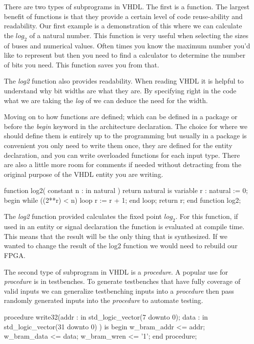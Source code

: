 There are two types of subprograms in \ac{VHDL}. The first is a function. The largest benefit of functions is that they provide a certain level of code reuse-ability and readability. Our first example is a demonstration of this where we can calculate the $log_2$ of a natural number. This function is very useful when selecting the sizes of buses and numerical values. Often times you know the maximum number you'd like to represent but then you need to find a calculator to determine the number of bits you need. This function saves you from that. 

The \emph{log2} function also provides readability. When reading \ac{VHDL} it is helpful to understand why bit widths are what they are. By specifying right in the code what we are taking the \emph{log} of we can deduce the need for the width. 

Moving on to how functions are defined; which can be defined in a package or before the \emph{begin} keyword in the architecture declaration. The choice for where we should define them is entirely up to the programming but usually in a package is convenient you only need to write them once, they are defined for the entity declaration, and you can write overloaded functions for each input type. There are also a little more room for comments if needed without detracting from the original purpose of the \ac{VHDL} entity you are writing. 
	
\begin{VHDLlisting}[tabsize=4]
function log2(
	constant n : in natural
) return natural is
	variable r : natural := 0;
begin
	while ((2**r) < n) loop
		r := r + 1;
	end loop;
	return r;
end function log2;
\end{VHDLlisting}

The \emph{log2} function provided calculates the fixed point $log_2$. For this function, if used in an entity or signal declaration the function is evaluated at compile time. This means that the result will be the only thing that is synthesized. If we wanted to change the result of the log2 function we would need to rebuild our \ac{FPGA}. 

The second type of subprogram in \ac{VHDL} is a \emph{procedure}. A popular use for \emph{procedure} is in testbenches. To generate testbenches that have fully coverage of valid inputs we can generalize testbenching inputs into a \emph{procedure} then pass randomly generated inputs into the \emph{procedure} to automate testing. 

\begin{VHDLlisting}[tabsize=4]
procedure write32(addr : in std_logic_vector(7 downto 0);
				  data : in std_logic_vector(31 downto 0) ) is
begin
	w_bram_addr <= addr;
	w_bram_data <= data;
	w_bram_wren <= '1';
end procedure;
\end{VHDLlisting}

